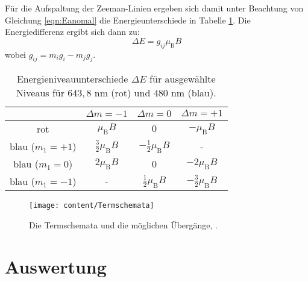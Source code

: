 Für die Aufspaltung der Zeeman-Linien ergeben sich damit unter Beachtung von Gleichung \ref{eqn:Eanomal} die Energieunterschiede in Tabelle \ref{tabenergy}. Die Energiedifferenz ergibt sich dann zu:
\begin{equation}
\Delta E = g_{ij} \mu_\text{B} B
\end{equation}
wobei $g_{ij} = m_ig_i-m_jg_j$.
\begin{table}[h]
	\begin{center}
		\begin{tabular}{c|ccc}
			&$\Delta m = -1$&$\Delta m = 0$&$\Delta m = +1$ \\ \hline
			rot & $\mu_{\text{B}} B$ & $0$ & $- \mu_{\text{B}} B$ \\
			blau ($m_1=+1$) & $\frac{3}{2} \mu_{\text{B}} B$ & $-\frac{1}{2} \mu_{\text{B}} B$ & - \\
			blau ($m_1=0$) & $2 \mu_{\text{B}} B$ & 0 & $-2 \mu_{\text{B}} B$ \\
			blau ($m_1=-1$) & - & $\frac{1}{2} \mu_{\text{B}} B$ & $-\frac{3}{2} \mu_{\text{B}} B$
		\end{tabular}
		\caption{Energieniveauunterschiede $\Delta E$ für ausgewählte Niveaus für $643{,}8\text{ nm}$ (rot) und $480 \text{ nm}$ (blau).}
		\label{tabenergy}
	\end{center}
\end{table}

\begin{figure}[h!]
	\centering
	\texttt{[image: content/Termschemata]}
	\caption{Die Termschemata und die möglichen Übergänge, \cite[5]{termschemata}.}
	\label{fig:termschemata}
\end{figure}

\section{Auswertung}
\label{sec:Auswertung}


